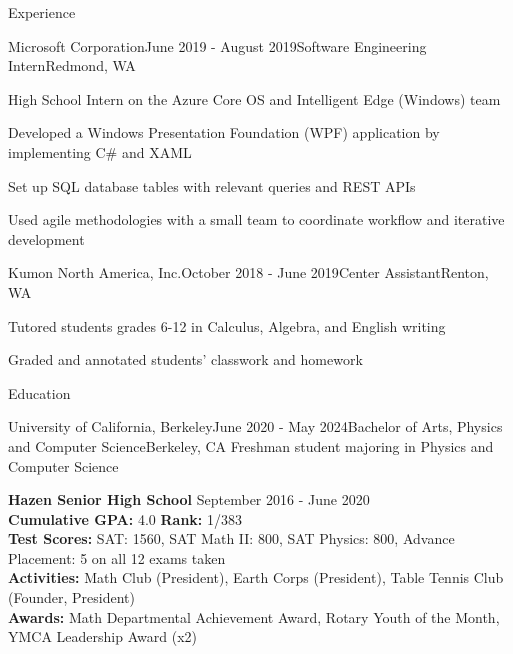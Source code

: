 \documentclass{resume} %
\begin{document}

\begin{rSection}{Experience}

\begin{rSubsection}{Microsoft Corporation}{June 2019 - August 2019}{Software Engineering Intern}{Redmond, WA}
\item High School Intern on the Azure Core OS and Intelligent Edge (Windows) team
\item Developed a Windows Presentation Foundation (WPF) application by implementing C\# and XAML
\item Set up SQL database tables with relevant queries and REST APIs
\item Used agile methodologies with a small team to coordinate workflow and iterative development
\end{rSubsection}


\begin{rSubsection}{Kumon North America, Inc.}{October 2018 - June 2019}{Center Assistant}{Renton, WA}
\item Tutored students grades 6-12 in Calculus, Algebra, and English writing
\item Graded and annotated students' classwork and homework
\end{rSubsection}

\end{rSection}


\begin{rSection}{Education}
    \begin{rSubsection}{University of California, Berkeley}{June 2020 - May 2024}{Bachelor of Arts, Physics and Computer Science}{Berkeley, CA}
        Freshman student majoring in Physics and Computer Science
        \end{rSubsection}

{\bf Hazen Senior High School} \hfill {September 2016 - June 2020}\\
{\bf Cumulative GPA:} 4.0 {\bf Rank:} 1/383 \smallskip \\
{\bf Test Scores:} SAT: 1560, SAT Math II: 800, SAT Physics: 800, Advance Placement: 5 on all 12 exams taken \\
{\bf Activities:} Math Club (President), Earth Corps (President), Table Tennis Club (Founder, President)\\
{\bf Awards:} Math Departmental Achievement Award, Rotary Youth of the Month, YMCA Leadership Award (x2)
\end{rSection}
\end{document}
